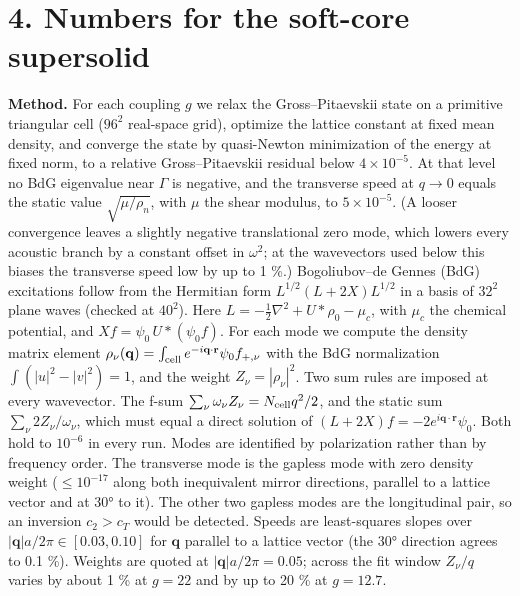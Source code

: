 \documentclass[
  11pt,
]{article}
\begin{document}
\hypertarget{numbers-for-the-soft-core-supersolid}{%
\section{4. Numbers for the soft-core
supersolid}\label{numbers-for-the-soft-core-supersolid}}

\textbf{Method.} For each coupling \(g\) we relax the Gross--Pitaevskii
state on a primitive triangular cell (\(96^2\) real-space grid),
optimize the lattice constant at fixed mean density, and converge the
state by quasi-Newton minimization of the energy at fixed norm, to a
relative Gross--Pitaevskii residual below \(4\times10^{-5}\). At that
level no BdG eigenvalue near \(\Gamma\) is negative, and the transverse
speed at \(q\to0\) equals the static value \(\sqrt{\mu/\rho_n}\), with
\(\mu\) the shear modulus, to \(5\times10^{-5}\). (A looser convergence
leaves a slightly negative translational zero mode, which lowers every
acoustic branch by a constant offset in \(\omega^2\); at the wavevectors
used below this biases the transverse speed low by up to 1 \%.)
Bogoliubov--de Gennes (BdG) excitations follow from the Hermitian form
\(L^{1/2}(L+2X)L^{1/2}\) in a basis of \(32^2\) plane waves (checked at
\(40^2\)). Here \(L=-\tfrac12\nabla^2+U*\rho_0-\mu_c\), with \(\mu_c\)
the chemical potential, and \(X f=\psi_0\,U*(\psi_0f)\). For each mode
we compute the density matrix element
\(\rho_\nu(\mathbf q)=\int_{\rm cell}e^{-i\mathbf q\cdot\mathbf r}\psi_0 f_{+,\nu}\)
with the BdG normalization \(\int(|u|^2-|v|^2)=1\), and the weight
\(Z_\nu=|\rho_\nu|^2\). Two sum rules are imposed at every wavevector.
The f-sum \(\sum_\nu\omega_\nu Z_\nu=N_{\rm cell}q^2/2\), and the static
sum \(\sum_\nu 2Z_\nu/\omega_\nu\), which must equal a direct solution
of \((L+2X)f=-2e^{i\mathbf q\cdot\mathbf r}\psi_0\). Both hold to
\(10^{-6}\) in every run. Modes are identified by polarization rather
than by frequency order. The transverse mode is the gapless mode with
zero density weight (\(\le10^{-17}\) along both inequivalent mirror
directions, parallel to a lattice vector and at 30° to it). The other
two gapless modes are the longitudinal pair, so an inversion \(c_2>c_T\)
would be detected. Speeds are least-squares slopes over
\(|\mathbf q|a/2\pi\in[0.03,0.10]\) for \(\mathbf q\) parallel to a
lattice vector (the 30° direction agrees to 0.1 \%). Weights are quoted
at \(|\mathbf q|a/2\pi=0.05\); across the fit window \(Z_\nu/q\) varies
by about 1 \% at \(g=22\) and by up to 20 \% at \(g=12.7\).
\end{document}
